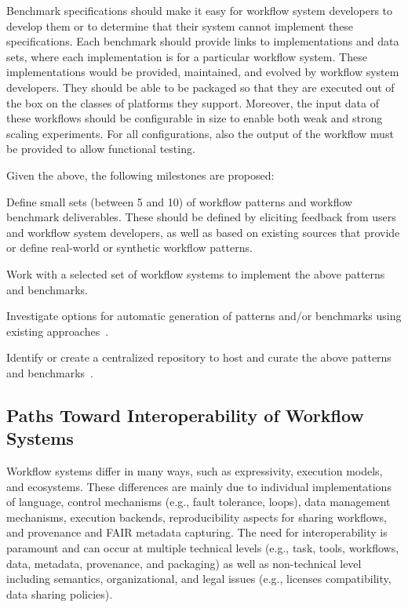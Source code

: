 Benchmark specifications should make it easy for workflow system developers to develop them or to determine that their system cannot implement these specifications. Each benchmark should provide links to implementations and data sets, where each implementation is for a particular workflow system. These implementations would be provided, maintained, and evolved by workflow system developers. They should be able to be packaged so that they are executed out of the box on the classes of platforms they support. Moreover, the input data of these workflows should be configurable in size to enable both weak and strong scaling experiments. For all configurations, also the output of the workflow must be provided to allow functional testing.

Given the above, the following milestones are proposed:

Define small sets (between 5 and 10) of workflow patterns and workflow benchmark deliverables. These should be defined by eliciting feedback from users and workflow system developers, as well as based on existing sources that provide or define real-world or synthetic workflow patterns. 

Work with a selected set of workflow systems to implement the above patterns and benchmarks.

Investigate options for automatic generation of patterns and/or benchmarks using existing approaches~\cite{katz2016application, coleman2021wfcommons}.

Identify or create a centralized repository to host and curate the above patterns and benchmarks~\cite{workflowhub, coleman2021wfcommons}.


\subsection{Paths Toward Interoperability of Workflow Systems}

Workflow systems differ in many ways, such as expressivity, execution models, and ecosystems. These differences are mainly due to individual implementations of language, control mechanisms (e.g., fault tolerance, loops), data management mechanisms, execution backends, reproducibility aspects for sharing workflows, and provenance and FAIR metadata capturing. The need for interoperability is paramount and can occur at multiple technical levels (e.g., task, tools, workflows, data, metadata, provenance, and packaging) as well as non-technical level including semantics, organizational, and legal issues (e.g., licenses compatibility, data sharing policies).

